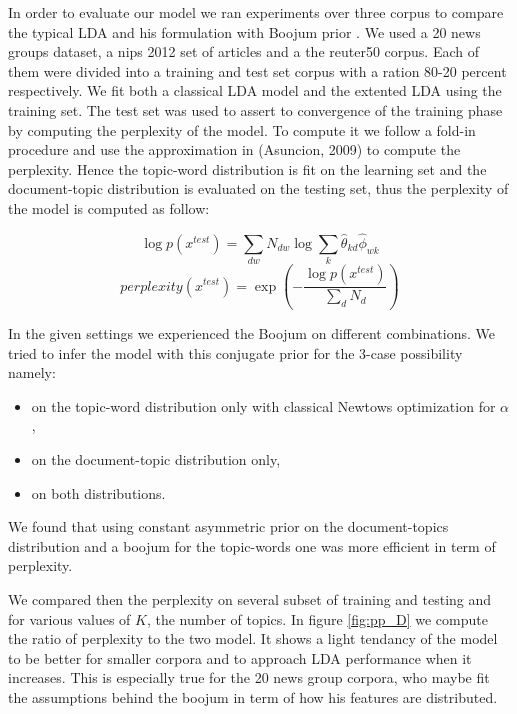 
In order to evaluate our model we ran experiments over three corpus to compare the typical LDA and his formulation with Boojum prior . We used a 20 news groups dataset, a nips 2012 set of articles and a the reuter50 corpus. Each of them were divided into a training and test set corpus with a ration 80-20 percent respectively. We fit both a classical LDA model and the extented LDA using the training set. The test set was used to assert to convergence of the training phase by computing the perplexity of the model. To compute it we follow a fold-in procedure and  use the approximation in (Asuncion, 2009) to compute the perplexity. Hence the topic-word distribution is fit on the learning set and the document-topic distribution is evaluated on the testing set, thus the perplexity of the model is computed as follow: 

\[ \log p(x^{test}) = \sum_{dw} N_{dw} \log \sum_k \hat{\theta}_{kd} \hat{\phi}_{wk} \]
\[ perplexity(x^{test}) = \exp(- \frac{\log p(x^{test})}{\sum_d N_d}) \]


In the given settings we experienced the Boojum on different combinations. We tried to infer the model with this conjugate prior for the 3-case possibility namely:
\begin{itemize}
\item on the topic-word distribution only with classical Newtows optimization for $\alpha$,
\item on the document-topic distribution only,
\item on both distributions. 
\end{itemize}

We found that using constant asymmetric prior on the document-topics distribution and a boojum for the topic-words one was more efficient in term of perplexity.

We compared then the perplexity on several subset of training and testing and for various values of $K$, the number of topics. In figure \ref{fig:pp_D} we compute the ratio of perplexity to the two model. It shows a light tendancy of the model to be better for smaller corpora and to approach LDA performance when it increases. This is especially true for the 20 news group corpora, who maybe fit the assumptions behind the boojum in term of how his features are distributed. 
\figure{}
\label{fig:pp_D}

